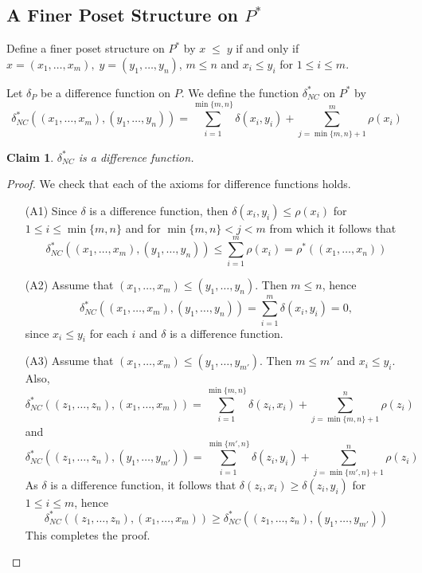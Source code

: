 \documentclass[acmsmall,review,anonymous]{acmart}\settopmatter{printfolios=true,printccs=false,printacmref=false}
\newtheorem{claim}{Claim}
\begin{document}
\subsection{A Finer Poset Structure on $P^*$}
Define a finer poset structure on $P^*$ by $x \; \leq \; y$
if and only if $x = (x_1, \ldots, x_m), \; y = (y_1, \ldots, y_n)$, $m \leq n$
and $x_i \leq y_i$ for $1 \leq i \leq m$.

Let $\delta_P$ be a difference function on $P$. We define the function
$\delta_{NC}^*$ on $P^*$ by
$$\delta_{NC}^*((x_1, \ldots, x_m), (y_1, \ldots, y_n)) = \sum_{i=1}^{\min\{m,
n\}}\delta(x_i, y_i) + \sum_{j = \min\{m, n\} + 1}^{m}\rho(x_i)$$
\begin{claim}
$\delta_{NC}^*$ is a difference function.
\end{claim}
\begin{proof}
We check that each of the axioms for difference functions holds.
\begin{enumerate}
  \item[(A1)]
  Since $\delta$ is a difference function, then $\delta(x_i, y_i)
  \leq \rho(x_i)$ for $1 \leq i \leq \min\{m, n\}$ and for $\min\{m, n\} < j <
  m$ from which it follows that
  $$\delta_{NC}^*((x_1, \ldots, x_m), (y_1,
  \ldots, y_n)) \leq \sum_{i=1}^m\rho(x_i) = \rho^*((x_1, \ldots, x_n))$$
  \item[(A2)]
  Assume that $(x_1, \ldots, x_m) \leq (y_1, \ldots, y_n)$. Then $m \leq n$,
  hence
  $$\delta_{NC}^*((x_1, \ldots, x_m), (y_1, \ldots, y_n)) =
  \sum_{i=1}^{m}\delta(x_i, y_i) = 0,$$
  since $x_i \leq y_i$ for each $i$ and $\delta$ is a difference function.
  \item[(A3)]
  Assume that $(x_1, \ldots, x_m) \leq (y_1, \ldots, y_{m'})$. Then $m \leq
  m'$ and $x_i \leq y_i$. Also, $$\delta_{NC}^*((z_1, \ldots, z_n), (x_1,
  \ldots, x_m)) = \sum_{i=1}^{\min\{m, n\}}\delta(z_i, x_i) + \sum_{j =
  \min\{m, n\} + 1}^{n}\rho(z_i)$$ and
  $$\delta_{NC}^*((z_1, \ldots, z_n), (y_1, \ldots, y_{m'})) =
  \sum_{i=1}^{\min\{m', n\}}\delta(z_i, y_i) + \sum_{j = \min\{m', n\} +
  1}^{n}\rho(z_i)$$
  As $\delta$ is a difference function, it follows that $\delta(z_i, x_i) \geq
  \delta(z_i, y_i)$ for $1 \leq i \leq m$, hence
  $$\delta_{NC}^*((z_1, \ldots, z_n), (x_1, \ldots, x_m)) \geq \delta_{NC}^*((z_1,
  \ldots, z_n), (y_1, \ldots, y_{m'}))$$ This completes the proof.
\end{enumerate}
\end{proof}
\fi
\end{document}
